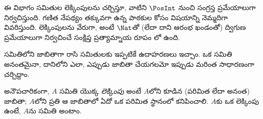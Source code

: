\documentclass[../../../include/open-logic-section]{subfiles}
\begin{document}


\begin{editorial}
  ఈ విభాగం సమితుల లెక్కింపులను చర్చిస్తూ, వాటిని $\PosInt$ నుంచి
  సంగ్రస్త ప్రమేయాలుగా నిర్వచిస్తుంది. గణిత నేపథ్యం తక్కువగా ఉన్న
  పాఠకుల కోసం విషయాన్ని నెమ్మదిగా వివరిస్తుంది. లెక్కింపులను వేరుగా,
  అంటే $\Nat$తో (లేదా దాని ఆరంభ ఖండంతో) ద్విగుణ ప్రమేయాలుగా
  నిర్వచించే సంక్షిప్త ప్రత్యామ్నాయ రూపం లో ఉంది.
\end{editorial}

\begin{explain}
సమితిలోని  జాబితాగా రాసి సమితులకు ఇప్పటికే ఉదాహరణలు
ఇచ్చాం. ఒక సమితి అనంతమైనా, దానిలోని  ఎలా, ఎప్పుడు
జాబితా చేయగలమో ఇప్పుడు మరింత సాధారణంగా చర్చిద్దాం.
\end{explain}

\begin{defn}[లెక్కింపు: అనౌపచారికంగా]
అనౌపచారికంగా, $A$ సమితి యొక్క \emph{లెక్కింపు} అంటే $A$లోని
 కూడిన (పరిమిత లేదా అనంత) జాబితా; $A$లోని ప్రతి
 ఆ జాబితాలో ఏదో ఒక పరిమిత స్థానంలో కనిపించాలి.
$A$కు ఒక లెక్కింపు ఉంటే, $A$ను \emph{} సమితి అంటాం.
\end{defn}
\end{document}
